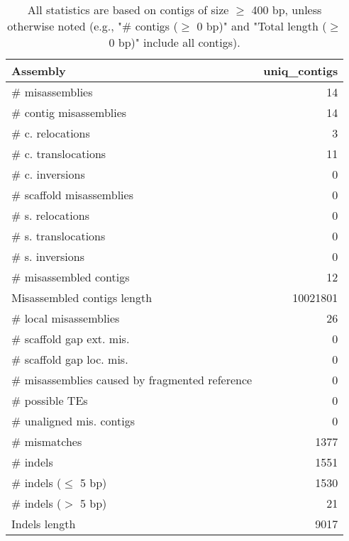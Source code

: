 \documentclass[12pt,a4paper]{article}
\begin{document}
\begin{table}[ht]
\begin{center}
\caption{All statistics are based on contigs of size $\geq$ 400 bp, unless otherwise noted (e.g., "\# contigs ($\geq$ 0 bp)" and "Total length ($\geq$ 0 bp)" include all contigs).}
\begin{tabular}{|l*{1}{|r}|}
\hline
Assembly & uniq\_contigs \\ \hline
\# misassemblies & 14 \\ \hline
\hspace{2mm}\# contig misassemblies & 14 \\ \hline
\hspace{5mm}\# c. relocations & 3 \\ \hline
\hspace{5mm}\# c. translocations & 11 \\ \hline
\hspace{5mm}\# c. inversions & 0 \\ \hline
\hspace{2mm}\# scaffold misassemblies & 0 \\ \hline
\hspace{5mm}\# s. relocations & 0 \\ \hline
\hspace{5mm}\# s. translocations & 0 \\ \hline
\hspace{5mm}\# s. inversions & 0 \\ \hline
\# misassembled contigs & 12 \\ \hline
Misassembled contigs length & 10021801 \\ \hline
\# local misassemblies & 26 \\ \hline
\# scaffold gap ext. mis. & 0 \\ \hline
\# scaffold gap loc. mis. & 0 \\ \hline
\# misassemblies caused by fragmented reference & 0 \\ \hline
\# possible TEs & 0 \\ \hline
\# unaligned mis. contigs & 0 \\ \hline
\# mismatches & 1377 \\ \hline
\# indels & 1551 \\ \hline
\hspace{5mm}\# indels ($\leq$ 5 bp) & 1530 \\ \hline
\hspace{5mm}\# indels ($>$ 5 bp) & 21 \\ \hline
Indels length & 9017 \\ \hline
\end{tabular}
\end{center}
\end{table}
\end{document}
